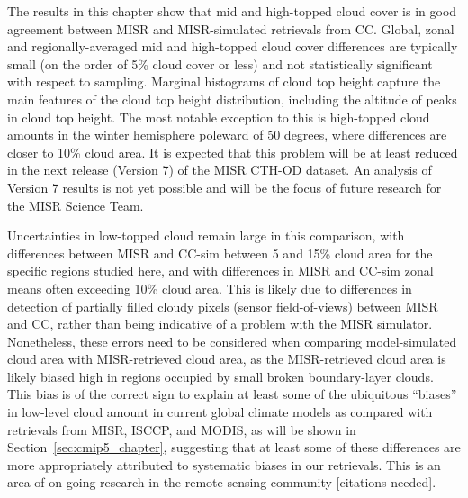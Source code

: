 The results in this chapter show that mid and high-topped cloud cover is
in good agreement between MISR and MISR-simulated retrievals from CC.
Global, zonal and regionally-averaged mid and high-topped cloud cover
differences are typically small (on the order of 5\% cloud cover or
less) and not statistically significant with respect to sampling.
Marginal histograms of cloud top height capture the main features of the
cloud top height distribution, including the altitude of peaks in cloud
top height. The most notable exception to this is high-topped cloud
amounts in the winter hemisphere poleward of 50 degrees, where
differences are closer to 10\% cloud area. It is expected that this
problem will be at least reduced in the next release (Version 7) of the
MISR CTH-OD dataset. An analysis of Version 7 results is not yet
possible and will be the focus of future research for the MISR Science
Team.

Uncertainties in low-topped cloud remain large in this comparison, with
differences between MISR and CC-sim between 5 and 15\% cloud area for
the specific regions studied here, and with differences in MISR and
CC-sim zonal means often exceeding 10\% cloud area. This is likely due
to differences in detection of partially filled cloudy pixels (sensor
field-of-views) between MISR and CC, rather than being indicative of a
problem with the MISR simulator. Nonetheless, these errors need to be
considered when comparing model-simulated cloud area with MISR-retrieved
cloud area, as the MISR-retrieved cloud area is likely biased high in
regions occupied by small broken boundary-layer clouds. This bias is of
the correct sign to explain at least some of the ubiquitous ``biases''
in low-level cloud amount in current global climate models as compared
with retrievals from MISR, ISCCP, and MODIS, as will be shown in
Section~\ref{sec:cmip5_chapter}, suggesting that at least some of these
differences are more appropriately attributed to systematic biases in
our retrievals. This is an area of on-going research in the remote
sensing community {[}citations needed{]}.


